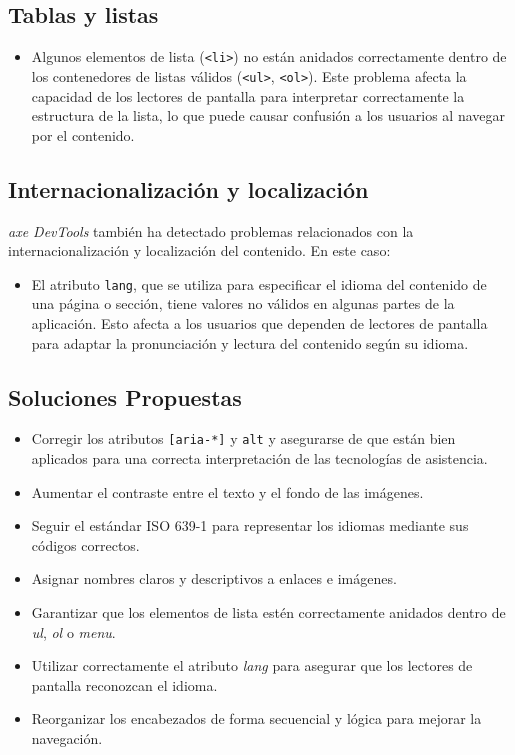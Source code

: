 \documentclass[]{article}
\begin{document}
\subsection*{Tablas y listas}
\begin{itemize} 
	\item Algunos elementos de lista (\texttt{<li>}) no están anidados correctamente dentro de los contenedores de listas válidos (\texttt{<ul>}, \texttt{<ol>}). Este problema afecta la capacidad de los lectores de pantalla para interpretar correctamente la estructura de la lista, lo que puede causar confusión a los usuarios al navegar por el contenido. 
\end{itemize}

\subsection*{Internacionalización y localización}
\textit{axe DevTools} también ha detectado problemas relacionados con la internacionalización y localización del contenido. En este caso:
\begin{itemize} 
	\item El atributo \texttt{lang}, que se utiliza para especificar el idioma del contenido de una página o sección, tiene valores no válidos en algunas partes de la aplicación. Esto afecta a los usuarios que dependen de lectores de pantalla para adaptar la pronunciación y lectura del contenido según su idioma. 
\end{itemize}

\subsection{Soluciones Propuestas}
\begin{itemize}
	\item Corregir los atributos \texttt{[aria-*]} y \texttt{alt} y asegurarse de que están bien aplicados para una correcta interpretación de las tecnologías de asistencia.
	\item Aumentar el contraste entre el texto y el fondo de las imágenes.
	\item Seguir el estándar ISO 639-1 para representar los idiomas mediante sus códigos correctos. 
	\item Asignar nombres claros y descriptivos a enlaces e imágenes.
	\item Garantizar que los elementos de lista estén correctamente anidados dentro de \textit{ul}, \textit{ol} o \textit{menu}.
	\item Utilizar correctamente el atributo \textit{lang} para asegurar que los lectores de pantalla reconozcan el idioma.
	\item Reorganizar los encabezados de forma secuencial y lógica para mejorar la navegación.
\end{itemize}
\end{document}
